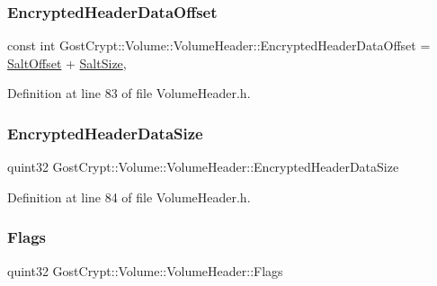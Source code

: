 \subsubsection{\texorpdfstring{Encrypted\+Header\+Data\+Offset}{EncryptedHeaderDataOffset}}
{\footnotesize\ttfamily const int Gost\+Crypt\+::\+Volume\+::\+Volume\+Header\+::\+Encrypted\+Header\+Data\+Offset = \hyperlink{class_gost_crypt_1_1_volume_1_1_volume_header_ab1d2f5c41d0b24c592fd2048d73c2171}{Salt\+Offset} + \hyperlink{class_gost_crypt_1_1_volume_1_1_volume_header_a37981e31384a8214ede95ed3d7e2e421}{Salt\+Size}\hspace{0.3cm}{\ttfamily [static]}, {\ttfamily [protected]}}



Definition at line 83 of file Volume\+Header.\+h.

\mbox{\label{class_gost_crypt_1_1_volume_1_1_volume_header_a25a781bf704835adc7735afe28409f4c}} 
\subsubsection{\texorpdfstring{Encrypted\+Header\+Data\+Size}{EncryptedHeaderDataSize}}
{\footnotesize\ttfamily quint32 Gost\+Crypt\+::\+Volume\+::\+Volume\+Header\+::\+Encrypted\+Header\+Data\+Size\hspace{0.3cm}{\ttfamily [protected]}}



Definition at line 84 of file Volume\+Header.\+h.

\mbox{\label{class_gost_crypt_1_1_volume_1_1_volume_header_a9e636980144674f2123169cd6575cc22}} 
\subsubsection{\texorpdfstring{Flags}{Flags}}
{\footnotesize\ttfamily quint32 Gost\+Crypt\+::\+Volume\+::\+Volume\+Header\+::\+Flags\hspace{0.3cm}{\ttfamily [protected]}}



